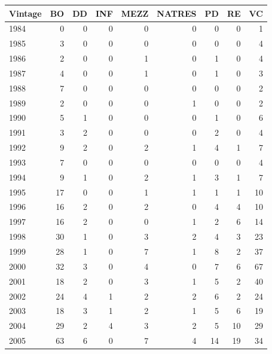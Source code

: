\documentclass[12pt]{article}
\begin{document}
\begin{table}[ht]
\centering
\begin{tabular}{lrrrrrrrr}
Vintage & BO & DD & INF & MEZZ & NATRES & PD & RE & VC \\ 
  \hline
\hline
  1984 &   0 &   0 &   0 &   0 &   0 &   0 &   0 &   1 \\ 
  1985 &   3 &   0 &   0 &   0 &   0 &   0 &   0 &   4 \\ 
  1986 &   2 &   0 &   0 &   1 &   0 &   1 &   0 &   4 \\ 
  1987 &   4 &   0 &   0 &   1 &   0 &   1 &   0 &   3 \\ 
  1988 &   7 &   0 &   0 &   0 &   0 &   0 &   0 &   2 \\ 
  1989 &   2 &   0 &   0 &   0 &   1 &   0 &   0 &   2 \\ 
  1990 &   5 &   1 &   0 &   0 &   0 &   1 &   0 &   6 \\ 
  1991 &   3 &   2 &   0 &   0 &   0 &   2 &   0 &   4 \\ 
  1992 &   9 &   2 &   0 &   2 &   1 &   4 &   1 &   7 \\ 
  1993 &   7 &   0 &   0 &   0 &   0 &   0 &   0 &   4 \\ 
  1994 &   9 &   1 &   0 &   2 &   1 &   3 &   1 &   7 \\ 
  1995 &  17 &   0 &   0 &   1 &   1 &   1 &   1 &  10 \\ 
  1996 &  16 &   2 &   0 &   2 &   0 &   4 &   4 &  10 \\ 
  1997 &  16 &   2 &   0 &   0 &   1 &   2 &   6 &  14 \\ 
  1998 &  30 &   1 &   0 &   3 &   2 &   4 &   3 &  23 \\ 
  1999 &  28 &   1 &   0 &   7 &   1 &   8 &   2 &  37 \\ 
  2000 &  32 &   3 &   0 &   4 &   0 &   7 &   6 &  67 \\ 
  2001 &  18 &   2 &   0 &   3 &   1 &   5 &   2 &  40 \\ 
  2002 &  24 &   4 &   1 &   2 &   2 &   6 &   2 &  24 \\ 
  2003 &  18 &   3 &   1 &   2 &   1 &   5 &   6 &  19 \\ 
  2004 &  29 &   2 &   4 &   3 &   2 &   5 &  10 &  29 \\ 
  2005 &  63 &   6 &   0 &   7 &   4 &  14 &  19 &  34 \\ 

\end{tabular}
\end{table}
\end{document}
